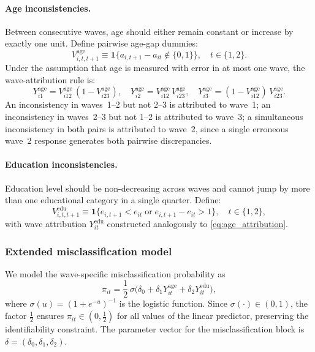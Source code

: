 \paragraph{Age inconsistencies.}
Between consecutive waves, age should either remain constant or increase
by exactly one unit. Define pairwise age-gap dummies:
\[
V_{i,t,t+1}^{\text{age}} \equiv
\mathbf{1}\!\Big\{a_{i,t+1} - a_{it} \notin \{0, 1\}\Big\},
\quad t \in \{1, 2\}.
\]
Under the assumption that age is measured with error in at most one wave,
the wave-attribution rule is:
\begin{equation}
Y_{i1}^{\text{age}} = V_{i12}^{\text{age}}\,(1 - V_{i23}^{\text{age}}), \quad
Y_{i2}^{\text{age}} = V_{i12}^{\text{age}}\, V_{i23}^{\text{age}}, \quad
Y_{i3}^{\text{age}} = (1 - V_{i12}^{\text{age}})\, V_{i23}^{\text{age}}.
\label{eq:age_attribution}
\end{equation}
An inconsistency in waves~1--2 but not 2--3 is attributed to wave~1; an
inconsistency in waves~2--3 but not 1--2 is attributed to wave~3; a
simultaneous inconsistency in both pairs is attributed to wave~2, since
a single erroneous wave~2 response generates both pairwise discrepancies.

\paragraph{Education inconsistencies.}
Education level should be non-decreasing across waves and cannot jump by
more than one educational category in a single quarter. Define:
\[
V_{i,t,t+1}^{\text{edu}} \equiv
\mathbf{1}\!\Big\{e_{i,t+1} < e_{it} \;\text{or}\;
e_{i,t+1} - e_{it} > 1\Big\},
\quad t \in \{1, 2\},
\]
with wave attribution \(Y_{it}^{\text{edu}}\) constructed analogously
to \eqref{eq:age_attribution}.

\subsubsection{Extended misclassification model}

We model the wave-specific misclassification probability as
\begin{equation}
\pi_{it} = \frac{1}{2}\,
  \sigma\!\Big(\delta_0 + \delta_1 Y_{it}^{\text{age}} + \delta_2 Y_{it}^{\text{edu}}\Big),
\label{eq:pi_link}
\end{equation}
where \(\sigma(u) = (1 + e^{-u})^{-1}\) is the logistic function. Since
\(\sigma(\cdot) \in (0, 1)\), the factor \(\tfrac{1}{2}\) ensures
\(\pi_{it} \in (0, \tfrac{1}{2})\) for all values of the linear
predictor, preserving the identifiability constraint. The parameter
vector for the misclassification block is
\(\delta = (\delta_0, \delta_1, \delta_2)\).

